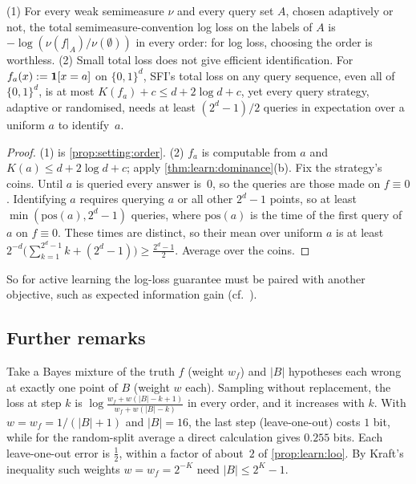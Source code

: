 \begin{proposition}\label{prop:learn:active}
(1) For every weak semimeasure $\nu$ and every query set $A$, chosen adaptively or not, the total semimeasure-convention log loss on the labels of $A$ is $-\log(\nu(f|_A)/\nu(\emptyset))$ in every order: for log loss, choosing the order is worthless.
(2) Small total loss does not give efficient identification. For $f_a(x):=\mathbf{1}[x=a]$ on $\{0,1\}^d$, SFI's total loss on any query sequence, even all of $\{0,1\}^d$, is at most $K(f_a)+c\le d+2\log d+c$, yet every query strategy, adaptive or randomised, needs at least $(2^d-1)/2$ queries in expectation over a uniform $a$ to identify~$a$.
\end{proposition}

\begin{proof}
(1) is \cref{prop:setting:order}. (2) $f_a$ is computable from $a$ and $K(a)\le d+2\log d+c$; apply \cref{thm:learn:dominance}(b). Fix the strategy's coins. Until $a$ is queried every answer is~$0$, so the queries are those made on $f\equiv0$. Identifying $a$ requires querying $a$ or all other $2^d-1$ points, so at least $\min(\mathrm{pos}(a),2^d-1)$ queries, where $\mathrm{pos}(a)$ is the time of the first query of $a$ on $f\equiv0$. These times are distinct, so their mean over uniform $a$ is at least $2^{-d}\big(\sum_{k=1}^{2^d-1}k+(2^d-1)\big)\ge\frac{2^d-1}2$. Average over the coins.
\end{proof}

So for active learning the log-loss guarantee must be paired with another objective, such as expected information gain (cf.\ \citealp{orseau2013universal}).

\subsection{Further remarks}\label{app:learn:remarks}

\begin{example}\label{rem:learn:increasing}
Take a Bayes mixture of the truth $f$ (weight $w_f$) and $|B|$ hypotheses each wrong at exactly one point of $B$ (weight $w$ each). Sampling without replacement, the loss at step $k$ is $\log\frac{w_f+w(|B|-k+1)}{w_f+w(|B|-k)}$ in every order, and it increases with $k$. With $w=w_f=1/(|B|+1)$ and $|B|=16$, the last step (leave-one-out) costs $1$ bit, while for the random-split average a direct calculation gives $0.255$ bits. Each leave-one-out error is $\frac12$, within a factor of about~$2$ of \cref{prop:learn:loo}. By Kraft's inequality such weights $w=w_f=2^{-K}$ need $|B|\le2^K-1$.
\end{example}

